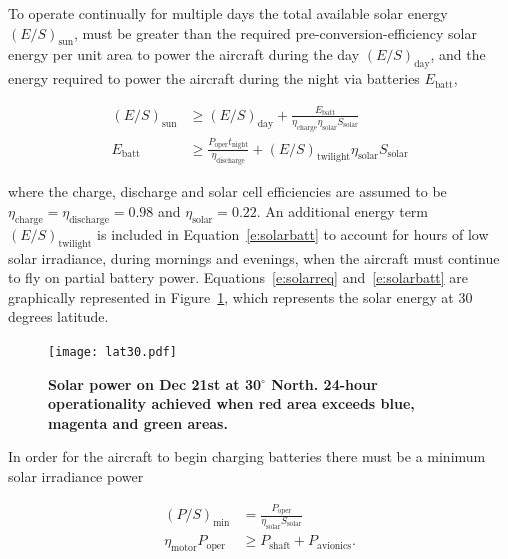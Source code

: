 To operate continually for multiple days the total available solar energy $(E/S)_{\text{sun}}$, must be greater than the required pre-conversion-efficiency solar energy per unit area to power the aircraft during the day $(E/S)_{\text{day}}$, and the energy required to power the aircraft during the night via batteries $E_{\text{batt}}$,\cite{solartech}

\begin{align}
    \label{e:solarreq}
    (E/S)_{\text{sun}}  &\geq (E/S)_{\text{day}} + \frac{E_{\text{batt}}}{\eta_{\text{charge}}\eta_{\text{solar}} S_{\text{solar}}} \\
    \label{e:solarbatt}
    E_{\text{batt}} &\geq \frac{P_{\text{oper}}t_{\text{night}}}{\eta_{\text{discharge}}} + (E/S)_{\text{twilight}} \eta_{\text{solar}} S_{\text{solar}}
\end{align}

where the charge, discharge and solar cell efficiencies are assumed to be $\eta_{\text{charge}} = \eta_{\text{discharge}} = 0.98$ and $\eta_{\text{solar}}= 0.22$. 
An additional energy term $(E/S)_{\text{twilight}}$ is included in Equation~\eqref{e:solarbatt} to account for hours of low solar irradiance, during mornings and evenings, when the aircraft must continue to fly on partial battery power. 
Equations~\eqref{e:solarreq} and~\eqref{e:solarbatt} are graphically represented in Figure~\ref{f:lat30}, which represents the solar energy at 30 degrees latitude. 

\begin{figure}[H]
	\begin{center}
	\texttt{[image: lat30.pdf]}
    \caption{\textbf{Solar power on Dec 21st at 30$^{\circ}$ North. 24-hour operationality achieved when red area exceeds blue, magenta and green areas. }}
	\label{f:lat30}
	\end{center}
\end{figure}

In order for the aircraft to begin charging batteries there must be a minimum solar irradiance power

\begin{align}
    (P/S)_{\text{min}} &= \frac{P_{\text{oper}}}{\eta_{\text{solar}} S_{\text{solar}}} \\
    \eta_{\text{motor}} P_{\text{oper}} &\geq P_{\text{shaft}} + P_{\text{avionics}}.
\end{align}

